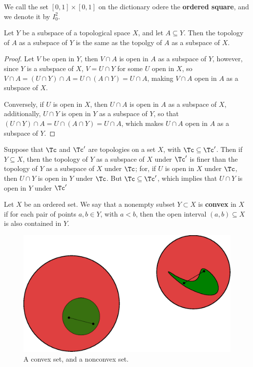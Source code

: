 \begin{definition}
    We call the set $[0,1] \times [0,1]$ on the dictionary odere the \textbf{ordered square}, and we
    denote it by $I_0^2$.
\end{definition}

\begin{lemma}\label{1.5.5}
    Let $Y$ be a subspace of a topological space  $X$, and let  $A \subseteq
    Y$. Then the topology of  $A$ as a subspace of  $Y$ is the same as the
    topolgy of  $A$ as a subspace of  $X$.
\end{lemma}
\begin{proof}
    Let $V$ be open in  $Y$, then $V \cap A$ is open in $A$ as a subspace of
    $Y$, however, since $Y$ is a subspace of $X$,  $V=U \cap Y$ for some  $U$
    open in $X$, so $V \cap A=(U \cap Y) \cap A=U \cap (A \cap Y)=U \cap A$,
    making $V \cap A$ open in $A$ as a subspace of $X$.

    Conversely, if $U$ is open in $X$, then $U \cap A$ is open in $A$ as a
    subspace of $X$, additionally, $U \cap Y$ is open in  $Y$ as a subspace of
    $Y$, so that  $(U \cap Y) \cap A=U \cap (A \cap Y)=U \cap A$, which makes $U
    \cap A$ open in $A$ as a subspace of $Y$.
\end{proof}

\begin{example}\label{1.9}
    Suppose that $\Tc$ and  $\Tc'$ are topologies on a set $X$, with $\Tc
    \subseteq \Tc'$. Then if  $Y \subseteq X$, then the topology of  $Y$ as a
    subspace of  $X$ under  $\Tc'$ is finer than the topology of  $Y$ as a
    subspace of  $X$ under  $\Tc$; for, if  $U$ is open in  $X$ under  $\Tc$,
    then  $U \cap Y$ is open in  $Y$ under  $\Tc$. But  $\Tc \subseteq \Tc'$,
    which implies that  $U \cap Y$ is open in  $Y$ under  $\Tc'$
\end{example}

\begin{definition}
    Let $X$ be an ordered set. We say that a nonempty subset $Y \subset X$ is \textbf{convex}
    in $X$ if for each pair of points  $a,b \in Y$, with  $a<b$, then the open interval  $(a,b) \subseteq X$ is
    also contained in  $Y$.
\end{definition}

\begin{figure}[h]
    \centering
    \includegraphics[scale = 0.5]{Figures/Chapter1/convex_nonconvex.eps}
    \caption{A convex set, and a nonconvex set.}
    \label{fig1.6}
\end{figure}

